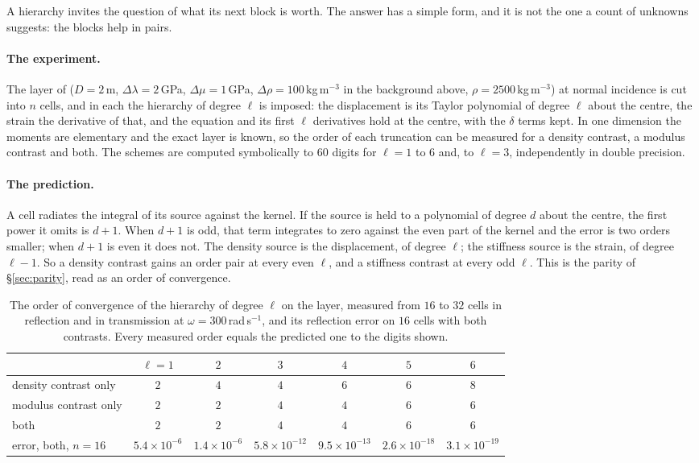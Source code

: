 \documentclass[11pt,a4paper]{article}
\begin{document}
A hierarchy invites the question of what its next block is worth. The answer has a simple form, and it
is not the one a count of unknowns suggests: the blocks help in pairs.

\paragraph{The experiment.} The layer of \citet{NestorError2026} ($D=2$\,m, $\Delta\lambda=2$\,GPa, $\Delta\mu=1$\,GPa,
$\Delta\rho=100$\,kg\,m$^{-3}$ in the background above, $\rho=2500$\,kg\,m$^{-3}$) at normal incidence is cut into $n$
cells, and in each the hierarchy of degree $\ell$ is imposed: the displacement is its Taylor polynomial
of degree $\ell$ about the centre, the strain the derivative of that, and the equation and its first
$\ell$ derivatives hold at the centre, with the $\delta$ terms kept. In one dimension the moments are
elementary and the exact layer is known, so the order of each truncation can be measured for a density
contrast, a modulus contrast and both. The schemes are computed symbolically to $60$ digits for $\ell=1$ to $6$
and, to $\ell=3$, independently in double precision.

\paragraph{The prediction.} A cell radiates the integral of its source against the kernel. If the
source is held to a polynomial of degree $d$ about the centre, the first power it omits is $d+1$. When
$d+1$ is odd, that term integrates to zero against the even part of the kernel and the error is two
orders smaller; when $d+1$ is even it does not. The density source is the displacement, of degree
$\ell$; the stiffness source is the strain, of degree $\ell-1$. So a density contrast gains an order
pair at every even $\ell$, and a stiffness contrast at every odd $\ell$. This is the parity of
\S\ref{sec:parity}, read as an order of convergence.

\begin{table}[htbp]
\centering
\caption{The order of convergence of the hierarchy of degree $\ell$ on the layer, measured from $16$ to
$32$ cells in reflection and in transmission at $\omega=300$\,rad\,s$^{-1}$, and its reflection error on
$16$ cells with both contrasts. Every measured order equals the predicted one to the digits
shown.}\label{tab:hierlayer}
\small
\begin{tabular}{@{}lcccccc@{}}
\toprule
 & $\ell=1$ & $2$ & $3$ & $4$ & $5$ & $6$ \\
\midrule
density contrast only & $2$ & $4$ & $4$ & $6$ & $6$ & $8$ \\
modulus contrast only & $2$ & $2$ & $4$ & $4$ & $6$ & $6$ \\
both & $2$ & $2$ & $4$ & $4$ & $6$ & $6$ \\
error, both, $n=16$ & $5.4\times10^{-6}$ & $1.4\times10^{-6}$ & $5.8\times10^{-12}$ & $9.5\times10^{-13}$
  & $2.6\times10^{-18}$ & $3.1\times10^{-19}$ \\
\bottomrule
\end{tabular}
\end{table}
\end{document}
